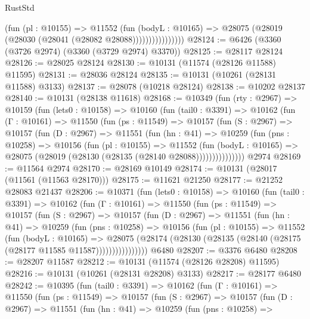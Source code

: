 \begin{lexlean}{RustStd}
\begin{coremodule}
                        (fun (pl : @10155) =>
                        @11552
                          (fun (bodyL : @10165) =>
                          @28075 (@28019 (@28030 (@28041 (@28082 @28088))))))))))))))))
@28124 := @6426 (@3360 (@3726 @2974) (@3360 (@3729 @2974) @3370))
@28125 := @28117 @28124
@28126 := @28025 @28124
@28130 := @10131 (@11574 (@28126 @11588) @11595)
@28131 := @28036 @28124
@28135 := @10131 (@10261 (@28131 @11588) @3133)
@28137 := @28078 (@10218 @28124)
@28138 := @10202 @28137
@28140 := @10131 (@28138 @11618)
@28168 := @10349
    (fun (rty : @2967) =>
    @10159
      (fun (lets0 : @10158) =>
      @10160
        (fun (tail0 : @3391) =>
        @10162
          (fun (Γ : @10161) =>
          @11550
            (fun (ps : @11549) =>
            @10157
              (fun (S : @2967) =>
              @10157
                (fun (D : @2967) =>
                @11551
                  (fun (hn : @41) =>
                  @10259
                    (fun (pns : @10258) =>
                    @10156
                      (fun (pl : @10155) =>
                      @11552
                        (fun (bodyL : @10165) =>
                        @28075 (@28019 (@28130 (@28135 (@28140 @28088)))))))))))))))
    @2974
@28169 := @11564 @2974
@28170 := @28169 @10149
@28174 := @10131 (@28017 (@11561 (@11563 @28170)))
@28175 := @11621 @21250
@28177 := @21252 @28083 @21437
@28206 := @10371
    (fun (lets0 : @10158) =>
    @10160
      (fun (tail0 : @3391) =>
      @10162
        (fun (Γ : @10161) =>
        @11550
          (fun (ps : @11549) =>
          @10157
            (fun (S : @2967) =>
            @10157
              (fun (D : @2967) =>
              @11551
                (fun (hn : @41) =>
                @10259
                  (fun (pns : @10258) =>
                  @10156
                    (fun (pl : @10155) =>
                    @11552
                      (fun (bodyL : @10165) =>
                      @28075
                        (@28174
                          (@28130 (@28135 (@28140 (@28175 (@28177 @11585 @11587))))))))))))))))
    @6480
@28207 := @3376 @6480
@28208 := @28207 @11587
@28212 := @10131 (@11574 (@28126 @28208) @11595)
@28216 := @10131 (@10261 (@28131 @28208) @3133)
@28217 := @28177 @6480
@28242 := @10395
    (fun (tail0 : @3391) =>
    @10162
      (fun (Γ : @10161) =>
      @11550
        (fun (ps : @11549) =>
        @10157
          (fun (S : @2967) =>
          @10157
            (fun (D : @2967) =>
            @11551
              (fun (hn : @41) =>
              @10259
                (fun (pns : @10258) =>

\end{coremodule}
\end{lexlean}
